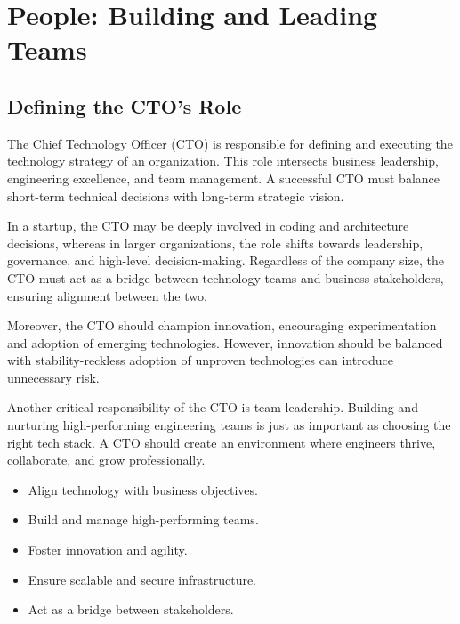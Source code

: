 \chapter{People: Building and Leading Teams}

\section{Defining the CTO's Role}
The Chief Technology Officer (CTO) is responsible for defining and executing the technology strategy of an organization. This role intersects business leadership, engineering excellence, and team management. A successful CTO must balance short-term technical decisions with long-term strategic vision.

In a startup, the CTO may be deeply involved in coding and architecture decisions, whereas in larger organizations, the role shifts towards leadership, governance, and high-level decision-making. Regardless of the company size, the CTO must act as a bridge between technology teams and business stakeholders, ensuring alignment between the two.

Moreover, the CTO should champion innovation, encouraging experimentation and adoption of emerging technologies. However, innovation should be balanced with stability-reckless adoption of unproven technologies can introduce unnecessary risk.

Another critical responsibility of the CTO is team leadership. Building and nurturing high-performing engineering teams is just as important as choosing the right tech stack. A CTO should create an environment where engineers thrive, collaborate, and grow professionally.

\begin{itemize}
    \item Align technology with business objectives.
    \item Build and manage high-performing teams.
    \item Foster innovation and agility.
    \item Ensure scalable and secure infrastructure.
    \item Act as a bridge between stakeholders.
\end{itemize}




